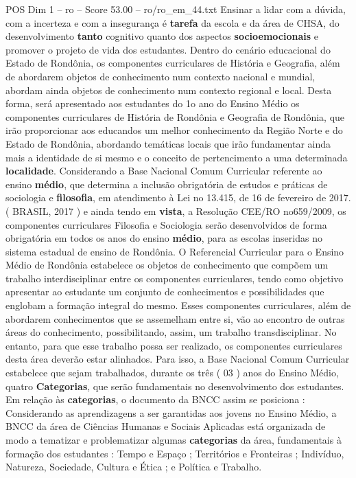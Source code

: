 \begin{textsample}{POS Dim 1 – ro – Score 53.00 – ro/ro\_em\_44.txt}
Ensinar a lidar com a dúvida, com a incerteza e com a insegurança é \textbf{tarefa} da escola e da área de CHSA, do desenvolvimento \textbf{tanto} cognitivo quanto dos aspectos \textbf{socioemocionais} e promover o projeto de vida dos estudantes.
Dentro do cenário educacional do Estado de Rondônia, os componentes curriculares de História e Geografia, além de abordarem objetos de conhecimento num contexto nacional e mundial, abordam ainda objetos de conhecimento num contexto regional e local.
Desta forma, será apresentado aos estudantes do 1o ano do Ensino Médio os componentes curriculares de História de Rondônia e Geografia de Rondônia, que irão proporcionar aos educandos um melhor conhecimento da Região Norte e do Estado de Rondônia, abordando temáticas locais que irão fundamentar ainda mais a identidade de si mesmo e o conceito de pertencimento a uma determinada \textbf{localidade}.
Considerando a Base Nacional Comum Curricular referente ao ensino \textbf{médio}, que determina a inclusão obrigatória de estudos e práticas de sociologia e \textbf{filosofia}, em atendimento à Lei no 13.415, de 16 de fevereiro de 2017. ( BRASIL, 2017 ) e ainda tendo em \textbf{vista}, a Resolução CEE/RO no659/2009, os componentes curriculares Filosofia e Sociologia serão desenvolvidos de forma obrigatória em todos os anos do ensino \textbf{médio}, para as escolas inseridas no sistema estadual de ensino de Rondônia.
O Referencial Curricular para o Ensino Médio de Rondônia estabelece os objetos de conhecimento que compõem um trabalho interdisciplinar entre os componentes curriculares, tendo como objetivo apresentar ao estudante um conjunto de conhecimentos e possibilidades que englobam a formação integral do mesmo.
Esses componentes curriculares, além de abordarem conhecimentos que se assemelham entre si, vão ao encontro de outras áreas do conhecimento, possibilitando, assim, um trabalho transdisciplinar.
No entanto, para que esse trabalho possa ser realizado, os componentes curriculares desta área deverão estar alinhados.
Para isso, a Base Nacional Comum Curricular estabelece que sejam trabalhados, durante os três ( 03 ) anos do Ensino Médio, quatro \textbf{Categorias}, que serão fundamentais no desenvolvimento dos estudantes.
Em relação às \textbf{categorias}, o documento da BNCC assim se posiciona : Considerando as aprendizagens a ser garantidas aos jovens no Ensino Médio, a BNCC da área de Ciências Humanas e Sociais Aplicadas está organizada de modo a tematizar e problematizar algumas \textbf{categorias} da área, fundamentais à formação dos estudantes : Tempo e Espaço ; Territórios e Fronteiras ; Indivíduo, Natureza, Sociedade, Cultura e Ética ; e Política e Trabalho.

\end{textsample}
